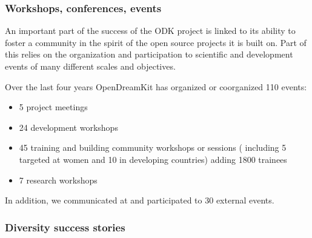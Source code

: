 \subsubsection{Workshops, conferences, events}


An important part of the success of the ODK project is linked to its
ability to foster a community in the spirit of the open source
projects it is built on. Part of this relies on the organization and
participation to scientific and development events of many different
scales and objectives.

Over the last four years OpenDreamKit has organized or coorganized 110
events:
\begin{itemize}
\item 5 project meetings
\item 24 development workshops
\item 45 training and building community workshops or sessions 
( including 5 targeted at women and 10 in developing countries) adding 1800 trainees
\item 7 research workshops
\end{itemize}
In addition, we communicated at and participated to 30 external events.

\subsubsection{Diversity success stories}
\label{diversity_success_stories}

